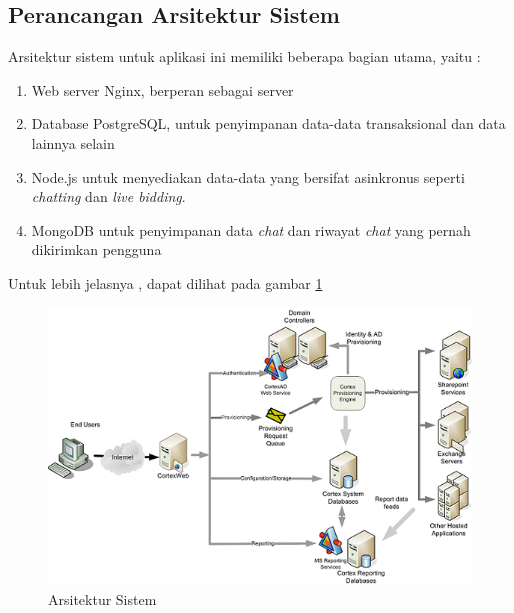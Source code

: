   \subsection{Perancangan Arsitektur Sistem}
	Arsitektur sistem untuk aplikasi ini memiliki beberapa bagian utama, yaitu :
    \
\begin{enumerate}
\item Web server Nginx, berperan sebagai server
\item Database PostgreSQL, untuk penyimpanan data-data transaksional dan data lainnya selain 
\item Node.js untuk menyediakan data-data yang bersifat asinkronus seperti \textit{chatting} dan \textit{live bidding}.
\item MongoDB untuk penyimpanan data \textit{chat} dan riwayat \textit{chat} yang pernah dikirimkan pengguna
\end{enumerate}
	Untuk lebih jelasnya , dapat dilihat pada gambar \ref{sysarch}
      \begin{figure}[H]
        \centering
        \includegraphics[width=\linewidth]{images/bab3/system-architecture.jpg}
        \caption{Arsitektur Sistem}
        \label{sysarch}
      \end{figure}